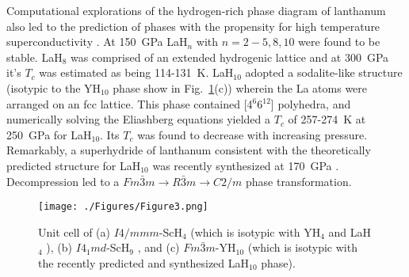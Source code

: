 \documentclass[12pt,letterpaper,oneside]{article}
\begin{document}
Computational explorations of the hydrogen-rich phase diagram of lanthanum also led to the prediction of phases with the propensity for high temperature superconductivity \cite{Liu:2017-La-Y}. At 150~GPa LaH$_n$ with $n=2-5,8,10$ were found to be stable.  LaH$_8$ was comprised of an extended hydrogenic lattice and at 300~GPa it's $T_c$ was estimated as being 114-131~K. LaH$_{10}$ adopted a sodalite-like structure (isotypic to the YH$_{10}$ phase show in Fig.\ \ref{fig:Group3}(c)) wherein the La atoms were arranged on an fcc lattice. This phase contained [4$^6$6$^{12}$] polyhedra, and numerically solving the Eliashberg equations yielded a $T_c$ of 257-274~K at 250~GPa for LaH$_{10}$. Its $T_c$ was found to decrease with increasing pressure. Remarkably, a superhydride of lanthanum consistent with the theoretically predicted structure for LaH$_{10}$ was recently synthesized at 170~GPa \cite{Geballe:2018a}. Decompression led to a $Fm\bar{3}m \rightarrow R\bar{3}m \rightarrow C2/m$ phase transformation.

\begin{figure}[h!]
\begin{center}
\texttt{[image: ./Figures/Figure3.png]}
\end{center}
\caption{Unit cell of (a) $I4/mmm$-ScH$_4$ \cite{Abe:Sc-2017,Qian:Sc-2017,Peng:Sc-2017,Zurek:2018b} (which is isotypic with YH$_4$ \cite{Li:2015a,Liu:2017-La-Y,Liu:2017-Y} and LaH$_4$ \cite{Liu:2017-La-Y}), (b) $I4_1md$-ScH$_9$ \cite{Zurek:2018b}, and (c) $Fm\bar{3}m$-YH$_{10}$ \cite{Li:2015a,Liu:2017-La-Y,Liu:2017-Y} (which is isotypic with the recently predicted \cite{Liu:2017-La-Y} and synthesized  \cite{Geballe:2018a} LaH$_{10}$ phase).}
\label{fig:Group3}
\end{figure}
\end{document}
